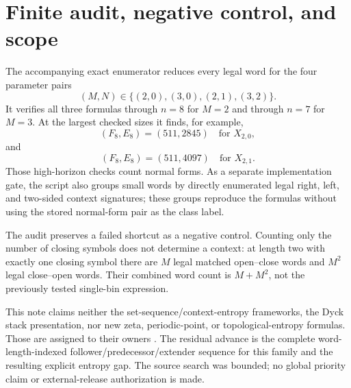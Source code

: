 \documentclass[11pt,a4paper]{amsart}
\theoremstyle{definition}
\theoremstyle{remark}
\begin{document}
\section{Finite audit, negative control, and scope}

The accompanying exact enumerator reduces every legal word for the four
parameter pairs
\[
 (M,N)\in\{(2,0),(3,0),(2,1),(3,2)\}.
\]
It verifies all three formulas through
$n=8$ for $M=2$ and through $n=7$ for $M=3$.  At the largest checked sizes it
finds, for example,
\[
 (F_8,E_8)=(511,2845)\quad\text{for }X_{2,0},
\]
and
\[
 (F_8,E_8)=(511,4097)\quad\text{for }X_{2,1}.
\]
Those high-horizon checks count normal forms.  As a separate implementation
gate, the script also groups small words by directly enumerated legal right,
left, and two-sided context signatures; these groups reproduce the formulas
without using the stored normal-form pair as the class label.

The audit preserves a failed shortcut as a negative control.  Counting only
the number of closing symbols does not determine a context: at length two
with exactly one closing symbol there are $M$ legal matched open--close words
and $M^2$ legal close--open words.  Their combined word count is $M+M^2$, not
the previously tested single-bin expression.

This note claims neither the set-sequence/context-entropy frameworks, the
Dyck stack presentation, nor new zeta, periodic-point, or topological-entropy
formulas.  Those are assigned to their owners
\cite{French2016,FrenchPavlov2019,KriegerMatsumoto2003,Inoue2010,KriegerMatsumoto2011}.
The residual advance is the complete word-length-indexed
follower/predecessor/extender sequence for this family and the resulting
explicit entropy gap.  The source search was bounded; no global priority
claim or external-release authorization is made.



\end{document}
